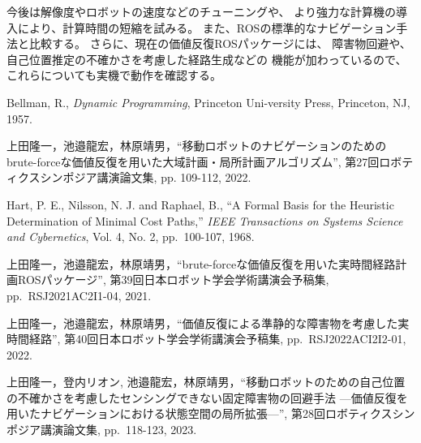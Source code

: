 \documentclass{jarticle}
\begin{document}
今後は解像度やロボットの速度などのチューニングや、
より強力な計算機の導入により、計算時間の短縮を試みる。
また、ROSの標準的なナビゲーション手法と比較する。
さらに、現在の価値反復ROSパッケージには、
障害物回避\cite{上田rsj2022}や、
自己位置推定の不確かさを考慮した経路生成\cite{上田robosym2023}などの
機能が加わっているので、これらについても実機で動作を確認する。



\footnotesize
\begin{thebibliography}{99}

	Bellman, R., {\it Dynamic Programming}, Princeton Uni-versity Press, Princeton, NJ, 1957.

	上田隆一，池邉龍宏，林原靖男，``移動ロボットのナビゲーションのためのbrute-forceな価値反復を用いた大域計画・局所計画アルゴリズム'', 
	第27回ロボティクスシンポジア講演論文集, pp. 109-112, 2022.
	
	Hart, P. E., Nilsson, N. J. and Raphael, B., ``A Formal
	Basis for the Heuristic Determination of Minimal Cost
	Paths,'' {\it IEEE Transactions on Systems Science and Cybernetics}, Vol. 4, No. 2, pp.~100-107, 1968.
	
	上田隆一，池邉龍宏，林原靖男，``brute-forceな価値反復を用いた実時間経路計画ROSパッケージ'', 
	第39回日本ロボット学会学術講演会予稿集, pp.~RSJ2021AC2I1-04, 2021.

	上田隆一，池邉龍宏，林原靖男，``価値反復による準静的な障害物を考慮した実時間経路'', 
	第40回日本ロボット学会学術講演会予稿集, pp.~RSJ2022ACI2I2-01, 2022.

	上田隆一，登内リオン, 池邉龍宏，林原靖男，``移動ロボットのための自己位置の不確かさを考慮したセンシングできない固定障害物の回避手法 ---価値反復を用いたナビゲーションにおける状態空間の局所拡張---'', 
	第28回ロボティクスシンポジア講演論文集, pp.~118-123, 2023.

\end{thebibliography}

\normalsize
\end{document}
